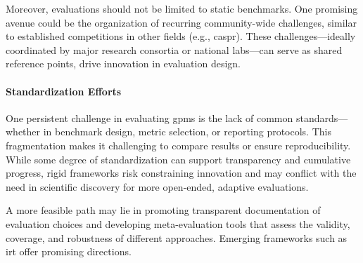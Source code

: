 Moreover, evaluations should not be limited to static benchmarks.
One promising avenue could be the organization of recurring community-wide challenges, similar to established competitions in other fields (e.g., \gls{caspr}\autocite{Moult2005}). These challenges---ideally coordinated by major research consortia or national labs---can serve as shared reference points, drive innovation in evaluation design.

\paragraph{Standardization Efforts} One persistent challenge in evaluating \glspl{gpm} is the lack of common standards---whether in benchmark design, metric selection, or reporting protocols. This fragmentation makes it challenging to compare results or ensure reproducibility. 
While some degree of standardization can support transparency and cumulative progress, rigid frameworks risk constraining innovation and may conflict with the need in scientific discovery for more open-ended, adaptive evaluations. 

A more feasible path may lie in promoting transparent documentation of evaluation choices and developing meta-evaluation tools that assess the validity, coverage, and robustness of different approaches. Emerging frameworks such as \gls{irt} offer promising directions. \autocite{schilling2025lifting}

